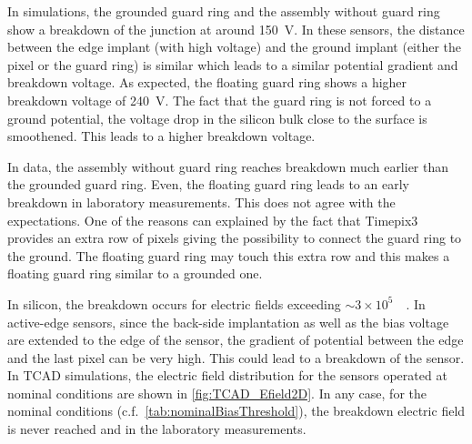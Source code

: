 In simulations, the grounded guard ring and the assembly without guard
ring show a breakdown of the junction at around 150~V. In these
sensors, the distance between the edge implant (with high voltage) and
the ground implant (either the pixel or the guard ring) is similar
which leads to a similar potential gradient and breakdown voltage. As
expected, the floating guard ring shows a higher breakdown voltage of
240~V. The fact that the guard ring is not forced to a ground
potential, the voltage drop in the silicon bulk close to the surface
is smoothened. This leads to a higher breakdown voltage.

In data, the assembly without guard ring reaches breakdown much
earlier than the grounded guard ring. Even, the floating guard ring
leads to an early breakdown in laboratory measurements. This does not
agree with the expectations. One of the reasons can explained by the
fact that Timepix3 provides an extra row of pixels giving the
possibility to connect the guard ring to the ground. The floating
guard ring may touch this extra row and this makes a floating guard
ring similar to a grounded one.


In silicon, the breakdown occurs for electric fields exceeding
$\sim3\times10^5$~\voltpercm~\cite{Sze:100213}. In active-edge
sensors, since the back-side implantation as well as the bias voltage
are extended to the edge of the sensor, the gradient of potential
between the edge and the last pixel can be very high. This could lead
to a breakdown of the sensor. In TCAD simulations, the electric field
distribution for the sensors operated at nominal conditions are shown
in \cref{fig:TCAD_Efield2D}. In any case, for the nominal conditions
(c.f.~\cref{tab:nominalBiasThreshold}), the breakdown electric field
is never reached and in the laboratory measurements.

